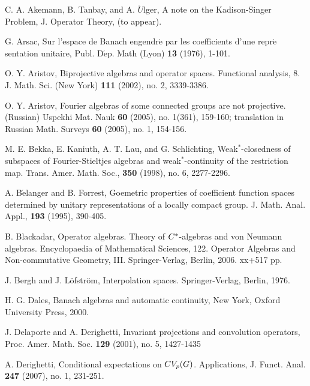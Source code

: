 \documentclass[10pt]{amsart}
\numberwithin{thm}{section}
\numberwithin{equation}{section}
\begin{document}

\providecommand{\bysame}{\leavevmode\hbox to3em{\hrulefill}\thinspace}
\begin{thebibliography}{1}

 C. A. Akemann, B. Tanbay, and A. $\ddot {U}$lger, A note on the Kadison-Singer Problem, J. Operator Theory, (to appear).  

G. Arsac, Sur l'espace de Banach engendr$\acute{\text{e}}$ par les coefficients d'une repr$\acute{\text{e}}$sentation unitaire,
Publ. D$\acute{\text{e}}$p. Math (Lyon) \textbf{13} (1976), 1-101.

O. Y. Aristov, Biprojective algebras and operator spaces. Functional analysis, 8.  J. Math. Sci. (New York) \textbf{111} (2002),  no. 2, 3339-3386.

O. Y. Aristov, Fourier algebras of some connected groups are not projective. (Russian)  Uspekhi Mat. Nauk  \textbf{60} (2005),  no. 1(361), 159-160;  translation in Russian Math. Surveys \textbf{60} (2005), no. 1, 154-156.

 M. E. Bekka, E. Kaniuth, A. T. Lau, and G. Schlichting, Weak$^*$-closedness of subspaces
of Fourier-Stieltjes algebras and weak$^*$-continuity of the restriction map. Trans. Amer. Math. Soc.,
\textbf{350} (1998), no. 6, 2277-2296.

A. B$\acute{\text{e}}$langer and B. Forrest,
Goemetric properties of coefficient function spaces determined by unitary representations of a locally compact group.
J. Math. Anal. Appl., \textbf{193} (1995), 390-405.

B. Blackadar, Operator algebras. Theory of $C\sp *$-algebras and von Neumann algebras. Encyclopaedia of Mathematical Sciences, 122.
Operator Algebras and Non-commutative Geometry, III. Springer-Verlag, Berlin, 2006. xx+517 pp.

J. Bergh and J. L\"{o}fstr\"{o}m, Interpolation spaces. Springer-Verlag, Berlin, 1976.

H. G. Dales, Banach algebras and automatic continuity, New York, Oxford University Press, 2000.

J. Delaporte and A. Derighetti, Invariant projections and convolution operators, Proc. Amer. Math. Soc. \textbf{129} (2001), no. 5, 1427-1435

A. Derighetti, Conditional expectations on $CV\sb p(G)$. Applications, J. Funct. Anal. \textbf{247} (2007), no. 1, 231-251.


\end{thebibliography}
\end{document}
